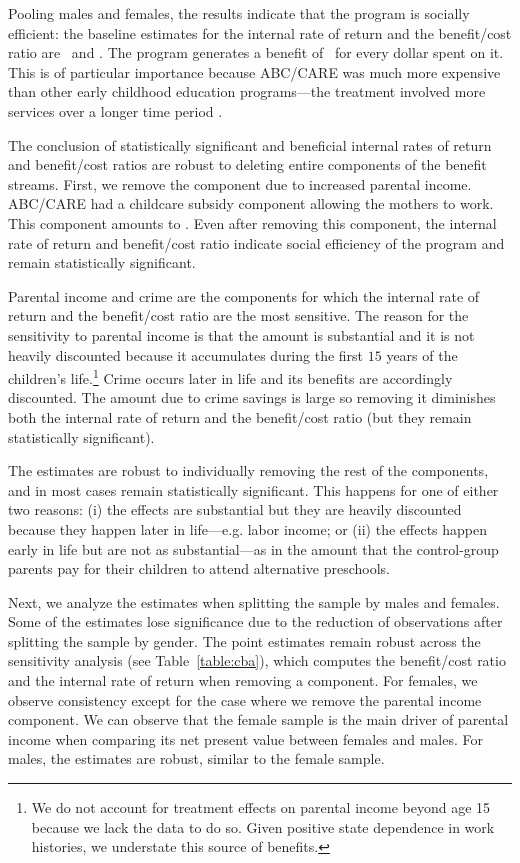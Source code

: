 Pooling males and females, the results indicate that the program is socially efficient: the baseline estimates for the internal rate of return and the benefit/cost ratio are \irrp\ and \bcp. The program generates a benefit of \bcp\ for every dollar spent on it. This is of particular importance because ABC/CARE was much more expensive than other early childhood education programs---the treatment involved more services over a longer time period \citep{Elango_Hojman_etal_2016_Early-Edu}.

The conclusion of statistically significant and beneficial internal rates of return and benefit/cost ratios are robust to deleting entire components of the benefit streams. First, we remove the component due to increased parental income. ABC/CARE had a childcare subsidy component allowing the mothers to work. This component amounts to \parincomenpvp. Even after removing this component, the internal rate of return and benefit/cost ratio indicate social efficiency of the program and remain statistically significant.

Parental income and crime are the components for which the internal rate of return and the benefit/cost ratio are the most sensitive. The reason for the sensitivity to parental income is that the amount is substantial and it is not heavily discounted because it accumulates during the first $15$ years of the children's life.\footnote{We do not account for treatment effects on parental income beyond age 15 because we lack the data to do so. Given positive state dependence in work histories, we understate this source of benefits.} Crime occurs later in life and its benefits are accordingly discounted. The amount due to crime savings is large so removing it diminishes both the internal rate of return and the benefit/cost ratio (but they remain statistically significant).

The estimates are robust to individually removing the rest of the components, and in most cases remain statistically significant. This happens for one of either two reasons: (i) the effects are substantial but they are heavily discounted because they happen later in life---e.g. labor income; or (ii) the effects happen early in life but are not as substantial---as in the amount that the control-group parents pay for their children to attend alternative preschools.

Next, we analyze the estimates when splitting the sample by males and females. Some of the estimates lose significance due to the reduction of observations after splitting the sample by gender. The point estimates remain robust across  the sensitivity analysis (see Table~\ref{table:cba}), which computes the benefit/cost ratio and the internal rate of return when removing a component. For females, we observe consistency except for the case where we remove the parental income component. We can observe that the female sample is the main driver of parental income when comparing its net present value between females and males. For males, the estimates are robust, similar to the female sample.

